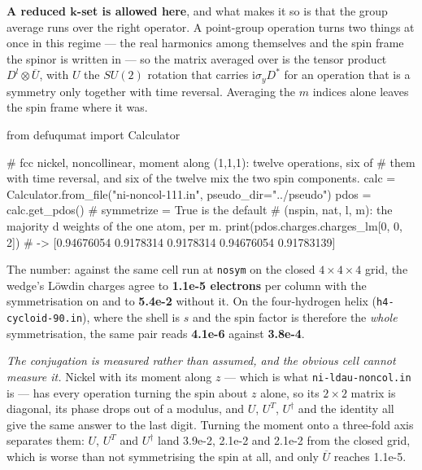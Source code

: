 \documentclass[11pt,a4paper]{article}
\newcommand{\code}[1]{\texttt{\small #1}}
\begin{document}
\textbf{A reduced $\mathbf k$-set is allowed here}, and what makes it so is that
the group average runs over the right operator. A point-group operation turns
two things at once in this regime --- the real harmonics among themselves and
the spin frame the spinor is written in --- so the matrix averaged over is the
tensor product $D^l \otimes \overline{U}$, with $U$ the $SU(2)$ rotation that
carries $\mathrm i \sigma_y D^{*}$ for an operation that is a symmetry only
together with time reversal. Averaging the $m$ indices alone leaves the spin
frame where it was.

\begin{pycode}
from defuqumat import Calculator

# fcc nickel, noncollinear, moment along (1,1,1): twelve operations, six of
# them with time reversal, and six of the twelve mix the two spin components.
calc = Calculator.from_file("ni-noncol-111.in", pseudo_dir="../pseudo")
pdos = calc.get_pdos()                   # symmetrize = True is the default
# (nspin, nat, l, m): the majority d weights of the one atom, per m.
print(pdos.charges.charges_lm[0, 0, 2])
# -> [0.94676054 0.9178314  0.9178314  0.94676054 0.91783139]
\end{pycode}

The number: against the same cell run at \code{nosym} on the closed
$4\times4\times4$ grid, the wedge's Löwdin charges agree to
\textbf{1.1e-5 electrons} per column with the symmetrisation on and to
\textbf{5.4e-2} without it. On the four-hydrogen helix
(\code{h4-cycloid-90.in}), where the shell is $s$ and the spin factor is
therefore the \emph{whole} symmetrisation, the same pair reads \textbf{4.1e-6}
against \textbf{3.8e-4}.

\emph{The conjugation is measured rather than assumed, and the obvious cell
cannot measure it.} Nickel with its moment along $z$ --- which is what
\code{ni-ldau-noncol.in} is --- has every operation turning the spin about $z$
alone, so its $2\times2$ matrix is diagonal, its phase drops out of a modulus,
and $U$, $U^{T}$, $U^{\dagger}$ and the identity all give the same answer to
the last digit. Turning the moment onto a three-fold axis separates them:
$U$, $U^{T}$ and $U^{\dagger}$ land 3.9e-2, 2.1e-2 and 2.1e-2 from the closed
grid, which is worse than not symmetrising the spin at all, and only
$\overline{U}$ reaches 1.1e-5.
\end{document}
